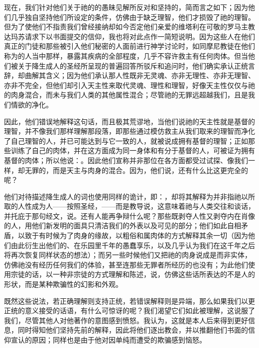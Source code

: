 现在，我们针对他们关于祂的的愚昧见解所反对和坚持的，简而言之如下；因为他们几乎独自坚持他们所设定的条件，仿佛由于缺乏理智，他们才损毁了祂的理智。但为了使他们不指责我们曾经接纳却如今否定他们亲爱的维塔利在可敬的罗马主教达玛苏请求下以书面提交的信仰，我也将对此点作一简短说明。因为这些人在他们真正的门徒和那些被引入他们秘密的人面前进行神学讨论时，如同摩尼教徒在他们称为的人当中那样，暴露其疾病的全部程度，几乎不容许救主有任何肉体。但当他们被关于降生成人的圣经所呈现的普遍回答所驳斥和追问时，他们确实承认正统言辞，却曲解其含义；因为他们承认那人性既非无灵魂、亦非无理性、亦非无理智、亦非不完全，但他们却引入天主性来取代灵魂、理性和理智，好像天主性仅仅与祂的肉身混合，而未与我们人类的其他属性混合；尽管祂的无罪远超越我们，且是我们情欲的净化。\par

因此，他们错误地解释这句话，而且极其荒谬地，当他们说祂的天主性就是基督的理智，并不像我们那样理解那段落，即那些通过模仿救主从我们取来的理智而净化了自己理智的人，并已可能达到与它一致的人，就被说成拥有基督的理智；正如那些训练了自己的肉体，并在这方面成为同一身体和有分于基督的人，可被证为拥有基督的肉体；所以他说：。因此他们宣称并非那位在各方面都受过试探、像我们一样，却无罪的，而是天主与肉身的混合。因为，他们说，还有什么比这更完全的呢？\par

他们对待描述降生成人的词也使用同样的诡计，即：，却将其解释为并非指祂以所取的人性成为人——按照圣经，——而是教导说，这意味着祂与人类交往和谈话，并托庇于那句经文，说。还有人能再争辩什么呢？那些既剥夺人性又剥夺内在肖像的人，用他们新发明的面具只清洁我们的外表以及可见的部分；他们如此自相矛盾，以致于有时候为了肉身的缘故，以粗俗和属肉体的方式解释其余一切（因为他们由此衍生出他们的、在乐园里千年的愚蠢享乐，以及几乎认为我们在这千年之后将再次恢复同样状态的想法）；而另一些时候他们又把祂的肉身说成是而非实体，仿佛祂没有经历任何我们的体验，甚至连那些无罪者所经历的也没有；为此他们使用宗徒的话，以一种非宗徒的方式理解和陈述，说，仿佛这些话所表达的不是人的形状，而是某种欺骗性的幻影和外观。\par

既然这些说法，若正确理解则支持正统，若错误解释则是异端，那么如果我们以更正统的意义接受的话语，有什么可惊讶的呢？我们渴望它们如此被理解，这说服了我们，尽管其他人对他著作的意图感到愤怒。我认为，这就是本人后来得到更好信息，同时得知他们坚持先前的解释，因此将他们逐出教会，并以推翻他们书面的信仰宣认的原因；同样也是由于他对因单纯而遭受的欺骗感到恼怒。\par

